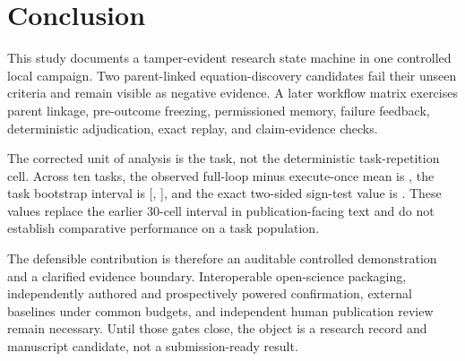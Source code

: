 \section{Conclusion}
\label{sec:conclusion}

This study documents a tamper-evident research state machine in one controlled
local campaign. Two parent-linked equation-discovery candidates fail their
unseen criteria and remain visible as negative evidence. A later workflow
matrix exercises parent linkage, pre-outcome freezing, permissioned memory,
failure feedback, deterministic adjudication, exact replay, and claim-evidence
checks.

The corrected unit of analysis is the task, not the deterministic
task-repetition cell. Across ten tasks, the observed full-loop minus
execute-once mean is \TaskLevelGain{}, the task bootstrap interval is
[\TaskLevelCILower{}, \TaskLevelCIUpper{}], and the exact two-sided sign-test
value is \SignTestTwoSided{}. These values replace the earlier 30-cell
interval in publication-facing text and do not establish comparative
performance on a task population.

The defensible contribution is therefore an auditable controlled
demonstration and a clarified evidence boundary. Interoperable open-science
packaging, independently authored and prospectively powered confirmation,
external baselines under common budgets, and independent human publication
review remain necessary. Until those gates close, the object is a research
record and manuscript candidate, not a submission-ready result.

